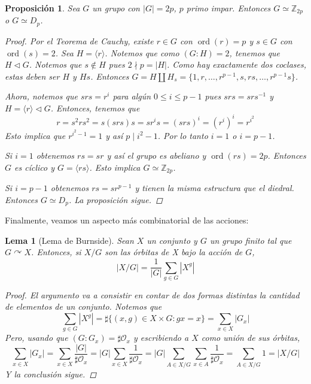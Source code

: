 \documentclass[12pt]{book}
\newtheorem{lem}[teo]{Lema}
\newtheorem{prop}[teo]{Proposición}
\theoremstyle{definition}
\newcommand{\ZZ}{\mathbb{Z}}      %
\DeclareMathOperator{\ord}{ord}
\def\acts{\curvearrowright}
\begin{document}
\begin{prop}
Sea $G$ un grupo con $|G|=2p$, $p$ primo impar. Entonces $G\simeq \ZZ_{2p}$ o $G\simeq D_p$.
\begin{proof}
Por el Teorema de Cauchy, existe $r\in G$ con $\ord (r) = p$ y $s\in G$ con $\ord (s) = 2$. Sea $H=\langle r\rangle$. Notemos que como $(G:H)=2$, tenemos que $H\triangleleft G$. Notemos que $s\notin H$ pues $2\nmid p = |H|$. Como hay exactamente dos coclases, estas deben ser $H$ y $Hs$. Entonces $G = H\coprod H_s = \{1,r,\ldots , r^{p-1},s,rs,\ldots , r^{p-1}s\}$.

Ahora, notemos que $srs = r^i$ para algún $0 \leq i\leq p-1$ pues $srs=srs^{-1}$ y $H=\langle r\rangle \triangleleft G$. Entonces, tenemos que $$ r = s^2 r s^2 = s(srs)s = sr^i s = (srs)^i = (r^i)^i = r^{i^2}$$Esto implica que $r^{i^2 -1} = 1$ y así $p\mid i^2 - 1$. Por lo tanto $i=1$ o $i=p-1$.

Si $i=1$ obtenemos $rs=sr$ y así el grupo es abeliano y $\ord(rs)=2p$. Entonces $G$ es cíclico y $G=\langle rs\rangle$. Esto implica $G\simeq \ZZ_{2p}$.

Si $i=p-1$ obtenemos $rs=sr^{p-1}$ y tienen la misma estructura que el diedral. Entonces $G\simeq D_p$. La proposición sigue.

\end{proof}
\end{prop}

Finalmente, veamos un aspecto más combinatorial de las acciones:

\begin{lem}[Lema de Burnside]
Sean $X$ un conjunto y $G$ un grupo finito tal que $G\acts X$. Entonces, si $X/G$ son las órbitas de X bajo la acción de $G$, $$ |X/G| = \dfrac{1}{|G|}\sum_{g\in G} |X^g|$$
\begin{proof}
El argumento va a consistir en contar de dos formas distintas la cantidad de elementos de un conjunto. Notemos que $$\displaystyle\sum_{g\in G} |X^g| = \sharp \{(x,g)\in X\times G : gx=x\} = \displaystyle\sum_{x\in X}|G_x|$$ Pero, usando que $(G:G_x)=\sharp \mathcal{O}_x$ y escribiendo a $X$ como unión de sus órbitas, $$\displaystyle\sum_{x\in X}|G_x| = \displaystyle\sum_{x\in X}\dfrac{|G|}{\sharp \mathcal{O}_x} = |G| \displaystyle\sum_{x\in X}\dfrac{1}{\sharp\mathcal{O}_x} = |G|\displaystyle\sum_{A\in X/G}\sum_{x\in A}\dfrac{1}{\sharp\mathcal{O}_x} = \displaystyle\sum_{A\in X/G} 1 = |X/G|$$ Y la conclusión sigue.
\end{proof}
\end{lem}
\end{document}
